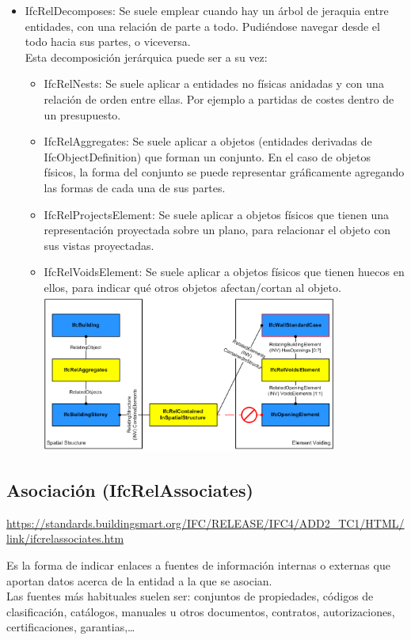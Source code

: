 \documentclass[spanish,12pt,a4paper,final,oneside]{book}
\begin{document}
\begin{itemize}
\item IfcRelDecomposes: Se suele emplear cuando hay un árbol de jeraquia entre entidades, con una relación de parte a todo. Pudiéndose navegar desde el todo hacia sus partes, o viceversa.
\\Esta decomposición jerárquica puede ser a su vez:
\begin{itemize}
\item IfcRelNests: Se suele aplicar a entidades no físicas anidadas y con una relación de orden entre ellas. Por ejemplo a partidas de costes dentro de un presupuesto.
\item IfcRelAggregates: Se suele aplicar a objetos (entidades derivadas de IfcObjectDefinition) que forman un conjunto. En el caso de objetos físicos, la forma del conjunto se puede representar gráficamente agregando las formas de cada una de sus partes. 
\item IfcRelProjectsElement: Se suele aplicar a objetos físicos que tienen una representación proyectada sobre un plano, para relacionar el objeto con sus vistas proyectadas.
\item IfcRelVoidsElement: Se suele aplicar a objetos físicos que tienen huecos en ellos, para indicar qué otros objetos afectan/cortan al objeto.
\\ \includegraphics[width=0.8\textwidth]{relacion entre un hueco y los elementos a los que afecta}
\end{itemize}

\end{itemize}



\subsection{Asociación (IfcRelAssociates)}
\url{https://standards.buildingsmart.org/IFC/RELEASE/IFC4/ADD2_TC1/HTML/link/ifcrelassociates.htm}

Es la forma de indicar enlaces a fuentes de información internas o externas que aportan datos acerca de la entidad a la que se asocian.
\\Las fuentes más habituales suelen ser: conjuntos de propiedades, códigos de clasificación, catálogos, manuales u otros documentos, contratos, autorizaciones, certificaciones, garantias,\ldots
\end{document}
